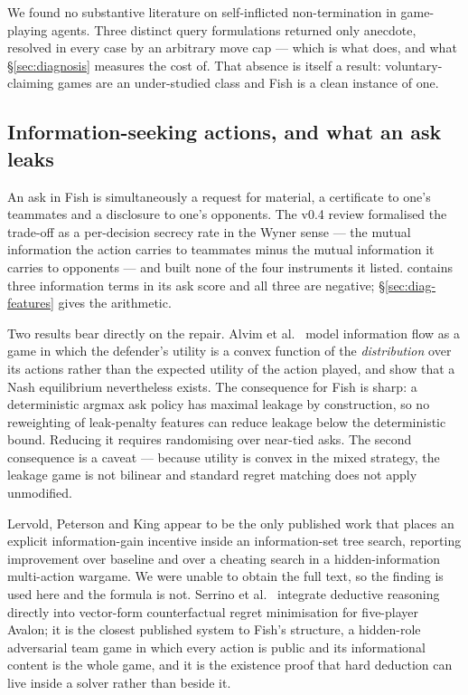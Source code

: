 We found no substantive literature on self-inflicted non-termination in
game-playing agents. Three distinct query formulations returned only anecdote,
resolved in every case by an arbitrary move cap --- which is what \vfour{} does,
and what \S\ref{sec:diagnosis} measures the cost of. That absence is itself a
result: voluntary-claiming games are an under-studied class and Fish is a clean
instance of one.

\subsection{Information-seeking actions, and what an ask leaks}
\label{sec:related-info}

An ask in Fish is simultaneously a request for material, a certificate to one's
teammates and a disclosure to one's opponents. The v0.4 review formalised the
trade-off as a per-decision secrecy rate in the Wyner \cite{wyner} sense --- the
mutual information the action carries to teammates minus the mutual information
it carries to opponents --- and built none of the four instruments it listed.
\vfour{} contains three information terms in its ask score and all three are
negative; \S\ref{sec:diag-features} gives the arithmetic.

Two results bear directly on the repair. Alvim et al.\ \cite{alvim-leakage} model
information flow as a game in which the defender's utility is a convex function
of the \emph{distribution} over its actions rather than the expected utility of
the action played, and show that a Nash equilibrium nevertheless exists. The
consequence for Fish is sharp: a deterministic argmax ask policy has maximal
leakage by construction, so no reweighting of leak-penalty features can reduce
leakage below the deterministic bound. Reducing it requires randomising over
near-tied asks. The second consequence is a caveat --- because utility is convex
in the mixed strategy, the leakage game is not bilinear and standard regret
matching does not apply unmodified.

Lervold, Peterson and King \cite{lervold-infogain} appear to be the only
published work that places an explicit information-gain incentive inside an
information-set tree search, reporting improvement over baseline and over a
cheating search in a hidden-information multi-action wargame. We were unable to
obtain the full text, so the finding is used here and the formula is not.
Serrino et al.\ \cite{serrino-deeprole} integrate deductive reasoning directly
into vector-form counterfactual regret minimisation for five-player Avalon; it is
the closest published system to Fish's structure, a hidden-role adversarial team
game in which every action is public and its informational content is the whole
game, and it is the existence proof that hard deduction can live inside a solver
rather than beside it.

